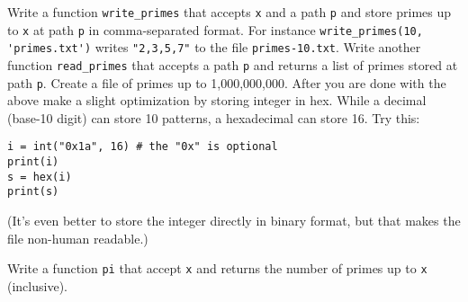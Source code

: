\begin{ex}
  Write a function \verb!write_primes! that accepts \verb!x! and a path \verb!p!
  and store primes up to \verb!x! at path \verb!p! in comma-separated format.
  For instance \verb!write_primes(10, 'primes.txt')!
  writes \verb!"2,3,5,7"! to the file \verb!primes-10.txt!.
  Write another function \verb!read_primes! that accepts a path \verb!p!
  and returns a list of primes stored at path \verb!p!.
  Create a file of primes up to 1,000,000,000.
  After you are done with the above make a slight optimization by storing
  integer in hex.
  While a decimal (base-10 digit) can store 10 patterns,
  a hexadecimal can store 16.
  Try this:
  \begin{Verbatim}[frame=single,fontsize=\footnotesize]
i = int("0x1a", 16) # the "0x" is optional
print(i)
s = hex(i)
print(s)
  \end{Verbatim}
  (It's even better to store the integer directly in binary format, but
  that makes the file non-human readable.)
\end{ex}

\begin{ex}
  Write a function \verb!pi! that accept \verb!x! and returns
  the number of primes up to \verb!x! (inclusive).
\end{ex}


